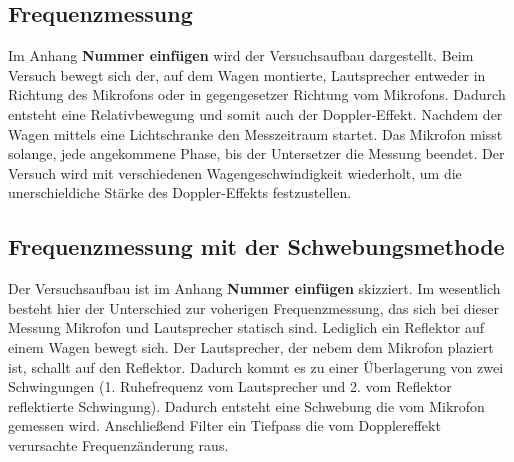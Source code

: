 \documentclass[parskip=half]{scrartcl} %
\begin{document}
\subsection{Frequenzmessung}

Im Anhang \textbf{Nummer einfügen} wird der Versuchsaufbau dargestellt.
Beim Versuch bewegt sich der, auf dem Wagen montierte, Lautsprecher entweder 
in Richtung des Mikrofons oder in gegengesetzer Richtung vom Mikrofons.
Dadurch entsteht eine Relativbewegung und somit auch der
Doppler-Effekt.
Nachdem der Wagen mittels eine Lichtschranke den Messzeitraum startet.
Das Mikrofon misst solange, jede angekommene Phase, bis der Untersetzer 
die Messung beendet.
Der Versuch wird mit verschiedenen Wagengeschwindigkeit
wiederholt, um die unerschieldiche Stärke des Doppler-Effekts 
festzustellen.

\subsection{Frequenzmessung mit der Schwebungsmethode}

Der Versuchsaufbau ist im Anhang \textbf{Nummer einfügen}
skizziert.
Im wesentlich besteht hier der Unterschied zur voherigen 
Frequenzmessung, das sich bei dieser Messung Mikrofon und
Lautsprecher statisch sind.
Lediglich ein Reflektor auf einem Wagen bewegt sich.
Der Lautsprecher, der nebem dem Mikrofon plaziert ist, schallt auf 
den Reflektor. Dadurch kommt es zu einer Überlagerung von zwei Schwingungen
(1. Ruhefrequenz vom Lautsprecher und 2. vom Reflektor reflektierte Schwingung).
Dadurch entsteht eine Schwebung die vom Mikrofon gemessen wird.
Anschließend Filter ein Tiefpass die vom Dopplereffekt verursachte 
Frequenzänderung raus.

\printbibliography
\printindex
\end{document}
